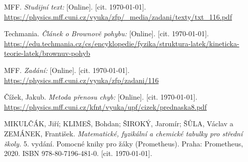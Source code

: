 
\begin{thebibliography}{9}
 MFF. \emph{Studijní text:} [Online]. [cit. \today]. \newline \url{https://physics.mff.cuni.cz/vyuka/zfp/_media/zadani/texty/txt_116.pdf}

 Techmania. \emph{Článek o Brownově pohybu:} [Online]. [cit. \today]. \newline \url{https://edu.techmania.cz/cs/encyklopedie/fyzika/struktura-latek/kineticka-teorie-latek/brownuv-pohyb}

 MFF. \emph{Zadání:} [Online]. [cit. \today]. \newline \url{https://physics.mff.cuni.cz/vyuka/zfp/zadani/116}

 Čížek, Jakub. \emph{Metoda přenosu chyb:} [Online]. [cit. \today]. \newline \url{https://physics.mff.cuni.cz/kfnt/vyuka/upf/cizek/prednaska8.pdf}

 MIKULČÁK, Jiří; KLIMEŠ, Bohdan; ŠIROKÝ, Jaromír; ŠŮLA, Václav a ZEMÁNEK, František. \emph{Matematické, fyzikální a chemické tabulky pro střední školy.} 5. vydání. Pomocné knihy pro žáky (Prometheus). Praha: Prometheus, 2020. ISBN 978-80-7196-481-0. [cit. \today].

\end{thebibliography}
